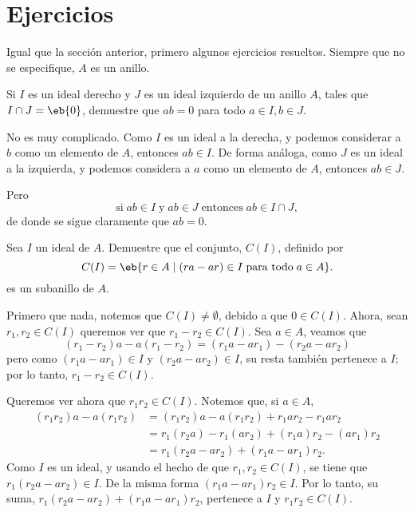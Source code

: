 %
\section{Ejercicios}
{\noindent Igual que la sección anterior, primero algunos ejercicios resueltos. Siempre que no se especifique, $A$ es un anillo.}

\begin{ejer}
	Si $I$ es un ideal derecho y $J$ es un ideal izquierdo de un anillo $A$, tales que $I\cap J = \eb{0}$, demuestre que $ab = 0$ para todo $a\in I, b\in J$.
\end{ejer}
\begin{sol}
	No es muy complicado. Como $I$ es un ideal a la derecha, y podemos considerar a $b$ como un elemento de $A$, entonces $ab\in I$. De forma análoga, como $J$ es un ideal a la izquierda, y podemos considera a $a$ como un elemento de $A$, entonces $ab\in J$.
	
	Pero 
	\[ \text{si} \; ab\in I \; \text{y} \; ab\in J \; \text{entonces} \; ab \in I\cap J, \]
	de donde se sigue claramente que $ab=0$.
\end{sol}

\begin{ejer}
	Sea $I$ un ideal de $A$. Demuestre que el conjunto, $C(I)$, definido por
	\[ C(I) = \eb{r\in A \mid (ra-ar)\in I \; \text{para todo} \; a\in A}.\] 
	es un subanillo de $A$.
\end{ejer}
\begin{sol}
		Primero que nada, notemos que $C(I)\neq \emptyset$, debido a que $0\in C(I)$. Ahora, sean $r_1,r_2\in C(I)$ queremos ver que $r_1-r_2\in C(I)$. Sea $a\in A$, veamos que
		\[ (r_1-r_2)a - a(r_1-r_2) = (r_1a-ar_1) - (r_2a - ar_2) \]
		pero como $(r_1a-ar_1)\in I$ y $(r_2a - ar_2)\in I$, su resta también pertenece a $I$; por lo tanto, $r_1-r_2\in C(I)$.
		
		Queremos ver ahora que $r_1r_2\in C(I)$. Notemos que, si $a\in A$,
		\begin{align*}
		(r_1r_2)a - a(r_1r_2) &= (r_1r_2)a - a(r_1r_2) + r_1ar_2 - r_1ar_2 \\
							  &= r_1(r_2a) - r_1(ar_2) + (r_1a)r_2 - (ar_1)r_2 \\
							  &= r_1(r_2a-ar_2) + (r_1a-ar_1)r_2.
		\end{align*} 
		Como $I$ es un ideal, y usando el hecho de que $r_1,r_2\in C(I)$, se tiene que $r_1(r_2a-ar_2) \in I$. De la misma forma $(r_1a-ar_1)r_2\in I$. Por lo tanto, su suma, $r_1(r_2a-ar_2) + (r_1a-ar_1)r_2$, pertenece a $I$ y $r_1r_2\in C(I)$. 
\end{sol}


